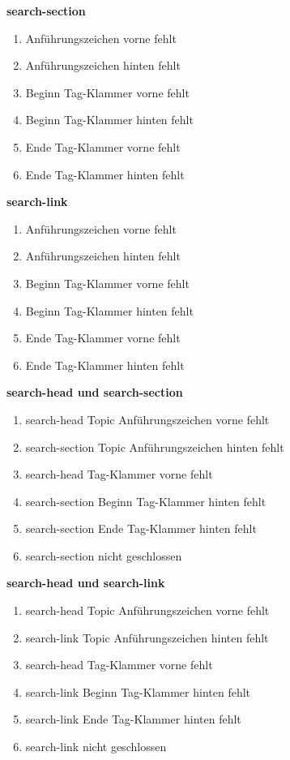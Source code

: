 \textbf{search-section}
\begin{enumerate}
\item Anführungszeichen vorne fehlt
\item Anführungszeichen hinten fehlt
\item Beginn Tag-Klammer vorne fehlt
\item Beginn Tag-Klammer hinten fehlt
\item Ende Tag-Klammer vorne fehlt
\item Ende Tag-Klammer hinten fehlt
\end{enumerate}

\textbf{search-link}
\begin{enumerate}
\item Anführungszeichen vorne fehlt
\item Anführungszeichen hinten fehlt
\item Beginn Tag-Klammer vorne fehlt
\item Beginn Tag-Klammer hinten fehlt
\item Ende Tag-Klammer vorne fehlt
\item Ende Tag-Klammer hinten fehlt
\end{enumerate}

\textbf{search-head und search-section} 
\begin{enumerate}
\item search-head Topic Anführungszeichen vorne fehlt
\item search-section Topic Anführungszeichen hinten fehlt
\item search-head Tag-Klammer vorne fehlt
\item search-section Beginn Tag-Klammer hinten fehlt
\item search-section Ende Tag-Klammer hinten fehlt
\item search-section nicht geschlossen
\end{enumerate}

\pagebreak
\textbf{search-head und search-link} 
\begin{enumerate}
\item search-head Topic Anführungszeichen vorne fehlt
\item search-link Topic Anführungszeichen hinten fehlt
\item search-head Tag-Klammer vorne fehlt
\item search-link Beginn Tag-Klammer hinten fehlt
\item search-link Ende Tag-Klammer hinten fehlt
\item search-link nicht geschlossen
\end{enumerate}


